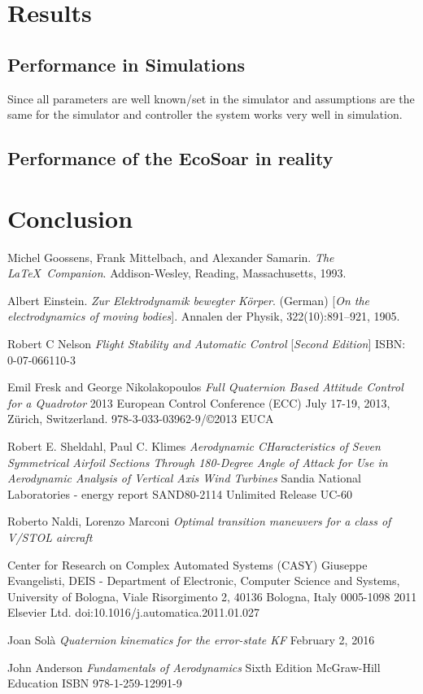 \documentclass{article}
\begin{document}
\section{Results}
\subsection{Performance in Simulations}
Since all parameters are well known/set in the simulator and assumptions are the same for the simulator and controller the system works very well in simulation.

\subsection{Performance of the EcoSoar in reality}

\section{Conclusion}

\begin{thebibliography}{9}
Michel Goossens, Frank Mittelbach, and Alexander Samarin. 
\textit{The \LaTeX\ Companion}. 
Addison-Wesley, Reading, Massachusetts, 1993.

Albert Einstein. 
\textit{Zur Elektrodynamik bewegter K{\"o}rper}. (German) 
[\textit{On the electrodynamics of moving bodies}]. 
Annalen der Physik, 322(10):891–921, 1905.

Robert C Nelson
\textit{Flight Stability and Automatic Control}
[\textit{Second Edition}]
ISBN: 0-07-066110-3

Emil Fresk and George Nikolakopoulos
\textit{Full Quaternion Based Attitude Control for a Quadrotor}
2013 European Control Conference (ECC)
July 17-19, 2013, Zürich, Switzerland.
978-3-033-03962-9/©2013 EUCA

Robert E. Sheldahl, Paul C. Klimes
\textit{Aerodynamic CHaracteristics of Seven Symmetrical Airfoil Sections Through 180-Degree Angle of Attack for Use in Aerodynamic Analysis of Vertical Axis Wind Turbines}
Sandia National Laboratories - energy report
SAND80-2114 Unlimited Release UC-60

Roberto Naldi, Lorenzo Marconi
\textit{Optimal transition maneuvers for a class of V/STOL aircraft}

Center for Research on Complex Automated Systems (CASY) Giuseppe Evangelisti, DEIS - Department of Electronic, Computer Science and Systems, University of Bologna, Viale
Risorgimento 2, 40136 Bologna, Italy
0005-1098 
2011 Elsevier Ltd.
doi:10.1016/j.automatica.2011.01.027

Joan Sol\`{a}
\textit{Quaternion kinematics for the error-state KF}
February 2, 2016

John Anderson
\textit{Fundamentals of Aerodynamics}
Sixth Edition
McGraw-Hill Education
ISBN 978-1-259-12991-9

\end{thebibliography}
\end{document}
